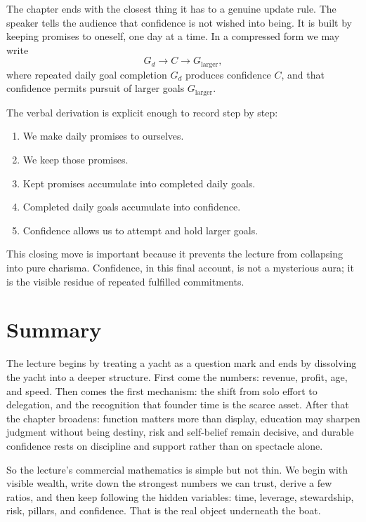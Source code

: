 The chapter ends with the closest thing it has to a genuine update rule. The speaker tells the audience that confidence is not wished into being. It is built by keeping promises to oneself, one day at a time. In a compressed form we may write
\begin{equation}
G_d \to C \to G_{\text{larger}},
\end{equation}
where repeated daily goal completion \(G_d\) produces confidence \(C\), and that confidence permits pursuit of larger goals \(G_{\text{larger}}\).

The verbal derivation is explicit enough to record step by step:
\begin{enumerate}
\item We make daily promises to ourselves.
\item We keep those promises.
\item Kept promises accumulate into completed daily goals.
\item Completed daily goals accumulate into confidence.
\item Confidence allows us to attempt and hold larger goals.
\end{enumerate}

This closing move is important because it prevents the lecture from collapsing into pure charisma. Confidence, in this final account, is not a mysterious aura; it is the visible residue of repeated fulfilled commitments.

\section{Summary}

The lecture begins by treating a yacht as a question mark and ends by dissolving the yacht into a deeper structure. First come the numbers: revenue, profit, age, and speed. Then comes the first mechanism: the shift from solo effort to delegation, and the recognition that founder time is the scarce asset. After that the chapter broadens: function matters more than display, education may sharpen judgment without being destiny, risk and self-belief remain decisive, and durable confidence rests on discipline and support rather than on spectacle alone.

So the lecture's commercial mathematics is simple but not thin. We begin with visible wealth, write down the strongest numbers we can trust, derive a few ratios, and then keep following the hidden variables: time, leverage, stewardship, risk, pillars, and confidence. That is the real object underneath the boat.